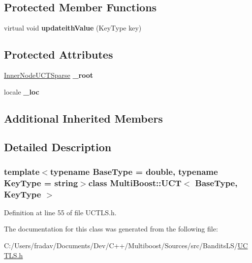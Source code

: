 \subsection*{Protected Member Functions}
\begin{DoxyCompactItemize}
\item 
\hypertarget{classMultiBoost_1_1UCT_a6d410f13c68c268e847bf2c8f312aee2}{virtual void {\bfseries updateith\-Value} (Key\-Type key)}\label{classMultiBoost_1_1UCT_a6d410f13c68c268e847bf2c8f312aee2}

\end{DoxyCompactItemize}
\subsection*{Protected Attributes}
\begin{DoxyCompactItemize}
\item 
\hypertarget{classMultiBoost_1_1UCT_acdc19a55c995a65cfe7aedcca3fd3d8d}{\hyperlink{classMultiBoost_1_1InnerNodeUCTSparse}{Inner\-Node\-U\-C\-T\-Sparse} {\bfseries \-\_\-root}}\label{classMultiBoost_1_1UCT_acdc19a55c995a65cfe7aedcca3fd3d8d}

\item 
\hypertarget{classMultiBoost_1_1UCT_a5860e118cc0f906a357a7576c5dfba4a}{locale {\bfseries \-\_\-loc}}\label{classMultiBoost_1_1UCT_a5860e118cc0f906a357a7576c5dfba4a}

\end{DoxyCompactItemize}
\subsection*{Additional Inherited Members}


\subsection{Detailed Description}
\subsubsection*{template$<$typename Base\-Type = double, typename Key\-Type = string$>$class Multi\-Boost\-::\-U\-C\-T$<$ Base\-Type, Key\-Type $>$}



Definition at line 55 of file U\-C\-T\-L\-S.\-h.



The documentation for this class was generated from the following file\-:\begin{DoxyCompactItemize}
\item 
C\-:/\-Users/fradav/\-Documents/\-Dev/\-C++/\-Multiboost/\-Sources/src/\-Bandits\-L\-S/\hyperlink{UCTLS_8h}{U\-C\-T\-L\-S.\-h}\end{DoxyCompactItemize}

